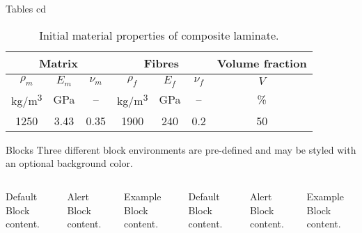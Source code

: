 \documentclass[10pt]{beamer} %
\begin{document}
\begin{frame}{Tables cd}
\begin{table}
	\label{tab:mat_prop}
	\renewcommand{\arraystretch}{1.3}
	\centering \footnotesize
	\caption{Initial material properties of composite laminate.}
	\begin{tabular}{ccccccc} 
		\toprule
		\multicolumn{3}{c}{\textbf{Matrix} }	& \multicolumn{3}{c}{\textbf{Fibres} } & \textbf{Volume fraction}	 \\ 
		\midrule
		$\rho_m$ & $E_m$ & $\nu_m$  & $\rho_f$ & $E_f$ & $\nu_f$ & $V$\\
		kg/m\textsuperscript{3} &GPa& --  & kg/m\textsuperscript{3}  & GPa& -- & \%\\ 
		\cmidrule(lr){1-3} \cmidrule(lr){4-6} \cmidrule(lr){7-7}
		1250 &3.43& 0.35& 1900 & 240 & 0.2 & 50\\
		\bottomrule 
	\end{tabular} 
\end{table}
\end{frame}
\begin{frame}{Blocks}
  Three different block environments are pre-defined and may be styled with an
  optional background color.

  \begin{columns}[T,onlytextwidth]
      \begin{block}{Default}
        Block content.
      \end{block}

      \begin{alertblock}{Alert}
        Block content.
      \end{alertblock}

      \begin{exampleblock}{Example}
        Block content.
      \end{exampleblock}



      \begin{block}{Default}
        Block content.
      \end{block}

      \begin{alertblock}{Alert}
        Block content.
      \end{alertblock}

      \begin{exampleblock}{Example}
        Block content.
      \end{exampleblock}

  \end{columns}
\end{frame}
\end{document}
